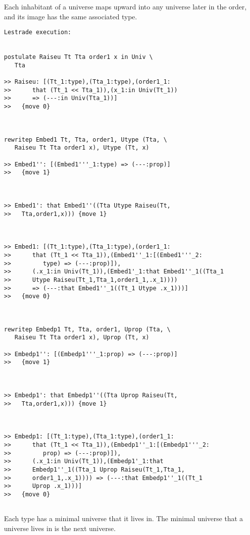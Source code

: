 \documentclass{article}
\begin{document}
Each inhabitant of a universe maps upward into any universe later in the order, and its image has the same
associated type.

\begin{verbatim}Lestrade execution:


postulate Raiseu Tt Tta order1 x in Univ \
   Tta

>> Raiseu: [(Tt_1:type),(Tta_1:type),(order1_1:
>>      that (Tt_1 << Tta_1)),(x_1:in Univ(Tt_1))
>>      => (---:in Univ(Tta_1))]
>>   {move 0}



rewritep Embed1 Tt, Tta, order1, Utype (Tta, \
   Raiseu Tt Tta order1 x), Utype (Tt, x)

>> Embed1'': [(Embed1'''_1:type) => (---:prop)]
>>   {move 1}



>> Embed1': that Embed1''((Tta Utype Raiseu(Tt,
>>   Tta,order1,x))) {move 1}



>> Embed1: [(Tt_1:type),(Tta_1:type),(order1_1:
>>      that (Tt_1 << Tta_1)),(Embed1''_1:[(Embed1'''_2:
>>         type) => (---:prop)]),
>>      (.x_1:in Univ(Tt_1)),(Embed1'_1:that Embed1''_1((Tta_1
>>      Utype Raiseu(Tt_1,Tta_1,order1_1,.x_1))))
>>      => (---:that Embed1''_1((Tt_1 Utype .x_1)))]
>>   {move 0}



rewritep Embedp1 Tt, Tta, order1, Uprop (Tta, \
   Raiseu Tt Tta order1 x), Uprop (Tt, x)

>> Embedp1'': [(Embedp1'''_1:prop) => (---:prop)]
>>   {move 1}



>> Embedp1': that Embedp1''((Tta Uprop Raiseu(Tt,
>>   Tta,order1,x))) {move 1}



>> Embedp1: [(Tt_1:type),(Tta_1:type),(order1_1:
>>      that (Tt_1 << Tta_1)),(Embedp1''_1:[(Embedp1'''_2:
>>         prop) => (---:prop)]),
>>      (.x_1:in Univ(Tt_1)),(Embedp1'_1:that
>>      Embedp1''_1((Tta_1 Uprop Raiseu(Tt_1,Tta_1,
>>      order1_1,.x_1)))) => (---:that Embedp1''_1((Tt_1
>>      Uprop .x_1)))]
>>   {move 0}


\end{verbatim}

Each type has  a minimal universe that it lives in.  The minimal universe that a universe lives in is the next universe.
\end{document}
